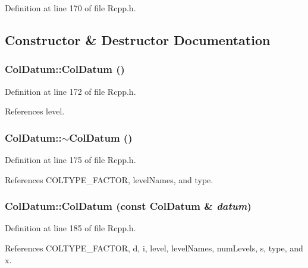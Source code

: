 Definition at line 170 of file Rcpp.h.

\subsection{Constructor \& Destructor Documentation}
\hypertarget{classColDatum_b0aa09b7e8d9acd2b0435b256c6b4da7}{
\subsubsection[ColDatum]{\setlength{\rightskip}{0pt plus 5cm}ColDatum::ColDatum ()}}
\label{classColDatum_b0aa09b7e8d9acd2b0435b256c6b4da7}




Definition at line 172 of file Rcpp.h.

References level.\hypertarget{classColDatum_ccc1e3ec9da32643bd4953f983165b64}{
\subsubsection[$\sim$ColDatum]{\setlength{\rightskip}{0pt plus 5cm}ColDatum::$\sim$ColDatum ()}}
\label{classColDatum_ccc1e3ec9da32643bd4953f983165b64}




Definition at line 175 of file Rcpp.h.

References COLTYPE\_\-FACTOR, levelNames, and type.\hypertarget{classColDatum_0507c6e2b4c76ee5364af001855fbe4e}{
\subsubsection[ColDatum]{\setlength{\rightskip}{0pt plus 5cm}ColDatum::ColDatum (const {\bf ColDatum} \& {\em datum})}}
\label{classColDatum_0507c6e2b4c76ee5364af001855fbe4e}




Definition at line 185 of file Rcpp.h.

References COLTYPE\_\-FACTOR, d, i, level, levelNames, numLevels, s, type, and x.

